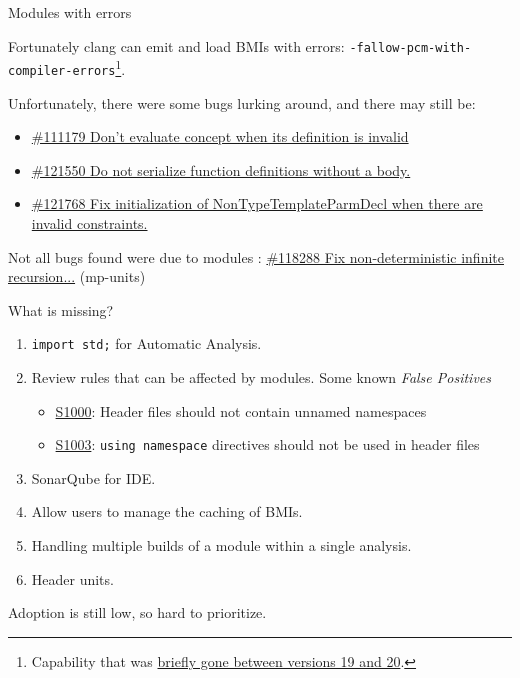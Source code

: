 \documentclass[aspectratio=169]{beamer}
\begin{document}
\begin{frame}[t]{Modules with errors}
  \begin{block}{}
    \small Fortunately clang can emit and load BMIs with errors: \texttt{-fallow-pcm-with-compiler-errors}\footnote{Capability that was \href{https://github.com/llvm/llvm-project/pull/121485}{briefly gone between versions 19 and 20}.}.

    \vspace{0.5em}

    Unfortunately, there were some bugs lurking around, and there may still be:
    \begin{itemize}
      \item \href{https://github.com/llvm/llvm-project/pull/111179}{\#111179 Don't evaluate concept when its definition is invalid}
      \item \href{https://github.com/llvm/llvm-project/pull/121550}{\#121550 Do not serialize function definitions without a body.}
      \item \href{https://github.com/llvm/llvm-project/pull/121768}{\#121768 Fix initialization of NonTypeTemplateParmDecl when there are invalid constraints.}
    \end{itemize}
  \end{block}
  \begin{block}{}
    \small Not all bugs found were due to modules :
    \href{https://github.com/llvm/llvm-project/pull/118288}{\#118288 Fix non-deterministic infinite recursion...} (mp-units)
  \end{block}
\end{frame}

\begin{frame}{What is missing?}
  \begin{block}{}
    \begin{enumerate}
      \item \texttt{import std;} for Automatic Analysis.
      \item Review rules that can be affected by modules. Some known \emph{False Positives}
            \begin{itemize}
              \item \href{https://sonarsource.github.io/rspec/\#/rspec/S1000/cfamily}{S1000}: Header files should not contain unnamed namespaces
              \item \href{https://sonarsource.github.io/rspec/\#/rspec/S1003/cfamily}{S1003}: \texttt{using namespace} directives should not be used in header files
            \end{itemize}
      \item SonarQube for IDE.
      \item Allow users to manage the caching of BMIs.
      \item Handling multiple builds of a module within a single analysis.
      \item Header units.
    \end{enumerate}
    Adoption is still low, so hard to prioritize.
  \end{block}
\end{frame}
\end{document}
